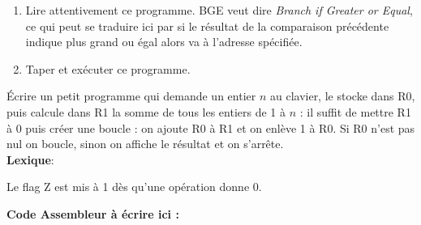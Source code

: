 \documentclass[a4paper,10pt,french]{article}
\begin{document}
\begin{exercice}[]
	\begin{enumerate}[\bfseries 1.]
		\item 	Lire attentivement ce programme. BGE veut dire \og \textit{Branch if Greater or Equal}\fg{}, ce qui peut se traduire ici par \og si le résultat de la comparaison précédente indique  plus grand ou égal alors va à l'adresse spécifiée\fg{}.
		\item 	Taper et exécuter ce programme.
	\end{enumerate}
\end{exercice}


\begin{exercice}[]
	\'Ecrire un petit programme qui demande un entier $n$ au clavier, le stocke dans R0, puis calcule dans R1 la
	somme de tous les entiers de 1 à $n$ : il suffit de mettre R1 à 0 puis créer une boucle : on ajoute R0 à R1 et on enlève 1 à R0. Si R0 n'est pas nul on boucle, sinon on affiche le résultat et on s'arrête.\\

\textbf{Lexique}:
Le flag Z est mis à 1 dès qu'une opération donne 0.
\end{exercice}

\textbf{Code Assembleur à écrire ici :}\\

\end{document}
